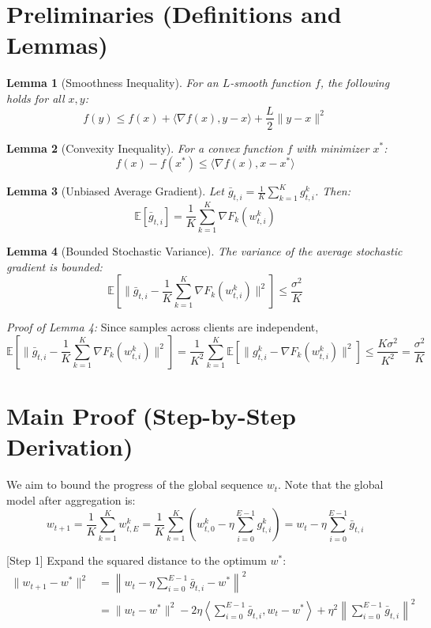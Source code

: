 \documentclass{article}
\newtheorem{lemma}{Lemma}
\begin{document}
\newpage
\section*{Preliminaries (Definitions and Lemmas)}
\begin{lemma}[Smoothness Inequality]
For an $L$-smooth function $f$, the following holds for all $x, y$:
$$ f(y) \leq f(x) + \langle \nabla f(x), y - x \rangle + \frac{L}{2}\|y - x\|^2 $$
\end{lemma}

\begin{lemma}[Convexity Inequality]
For a convex function $f$ with minimizer $x^*$:
$$ f(x) - f(x^*) \leq \langle \nabla f(x), x - x^* \rangle $$
\end{lemma}

\begin{lemma}[Unbiased Average Gradient]
Let $\bar{g}_{t,i} = \frac{1}{K}\sum_{k=1}^K g_{t,i}^k$. Then:
$$ \mathbb{E}[\bar{g}_{t,i}] = \frac{1}{K}\sum_{k=1}^K \nabla F_k(w_{t,i}^k) $$
\end{lemma}

\begin{lemma}[Bounded Stochastic Variance]
The variance of the average stochastic gradient is bounded:
$$ \mathbb{E}[\|\bar{g}_{t,i} - \frac{1}{K}\sum_{k=1}^K \nabla F_k(w_{t,i}^k)\|^2] \leq \frac{\sigma^2}{K} $$
\end{lemma}
\textit{Proof of Lemma 4:} Since samples across clients are independent,
$$ \mathbb{E}[\|\bar{g}_{t,i} - \frac{1}{K}\sum_{k=1}^K \nabla F_k(w_{t,i}^k)\|^2] = \frac{1}{K^2}\sum_{k=1}^K \mathbb{E}[\|g_{t,i}^k - \nabla F_k(w_{t,i}^k)\|^2] \leq \frac{K\sigma^2}{K^2} = \frac{\sigma^2}{K} $$


\section*{Main Proof (Step-by-Step Derivation)}
We aim to bound the progress of the global sequence $w_t$. Note that the global model after aggregation is:
$$ w_{t+1} = \frac{1}{K}\sum_{k=1}^K w_{t,E}^k = \frac{1}{K}\sum_{k=1}^K \left( w_{t,0}^k - \eta \sum_{i=0}^{E-1} g_{t,i}^k \right) = w_t - \eta \sum_{i=0}^{E-1} \bar{g}_{t,i} $$

[Step 1] Expand the squared distance to the optimum $w^*$:
\begin{align*}
\|w_{t+1} - w^*\|^2 &= \left\| w_t - \eta \sum_{i=0}^{E-1} \bar{g}_{t,i} - w^* \right\|^2 \\
&= \|w_t - w^*\|^2 - 2\eta \left\langle \sum_{i=0}^{E-1} \bar{g}_{t,i}, w_t - w^* \right\rangle + \eta^2 \left\| \sum_{i=0}^{E-1} \bar{g}_{t,i} \right\|^2
\end{align*}
\end{document}
